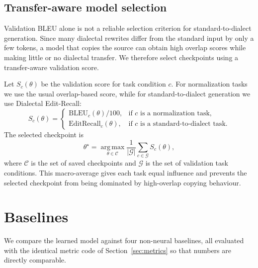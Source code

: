 \documentclass[11pt]{article}
\begin{document}
\subsection{Transfer-aware model selection}
\label{sec:method-select}

Validation BLEU alone is not a reliable selection criterion for
standard-to-dialect generation. Since many dialectal rewrites differ from the
standard input by only a few tokens, a model that copies the source can obtain
high overlap scores while making little or no dialectal transfer. We therefore
select checkpoints using a transfer-aware validation score.

Let \(S_c(\theta)\) be the validation score for task condition \(c\). For
normalization tasks we use the usual overlap-based score, while for
standard-to-dialect generation we use Dialectal Edit-Recall:
\begin{equation}
  S_c(\theta)
  =
  \begin{cases}
    \mathrm{BLEU}_{c}(\theta)/100,
    & \text{if } c \text{ is a normalization task}, \\[3pt]
    \mathrm{EditRecall}_{c}(\theta),
    & \text{if } c \text{ is a standard-to-dialect task}.
  \end{cases}
  \label{eq:selection-score}
\end{equation}
The selected checkpoint is
\begin{equation}
  \theta^\star
  =
  \operatorname*{arg\,max}_{\theta\in\mathcal{C}}
  \frac{1}{|\mathcal{G}|}
  \sum_{c\in\mathcal{G}} S_c(\theta),
  \label{eq:selected-checkpoint}
\end{equation}
where \(\mathcal{C}\) is the set of saved checkpoints and \(\mathcal{G}\) is the
set of validation task conditions. This macro-average gives each task equal
influence and prevents the selected checkpoint from being dominated by
high-overlap copying behaviour.



\section{Baselines}
\label{sec:baselines}

We compare the learned model against four non-neural baselines, all evaluated with
the identical metric code of Section~\ref{sec:metrics} so that numbers are
directly comparable.
\end{document}
